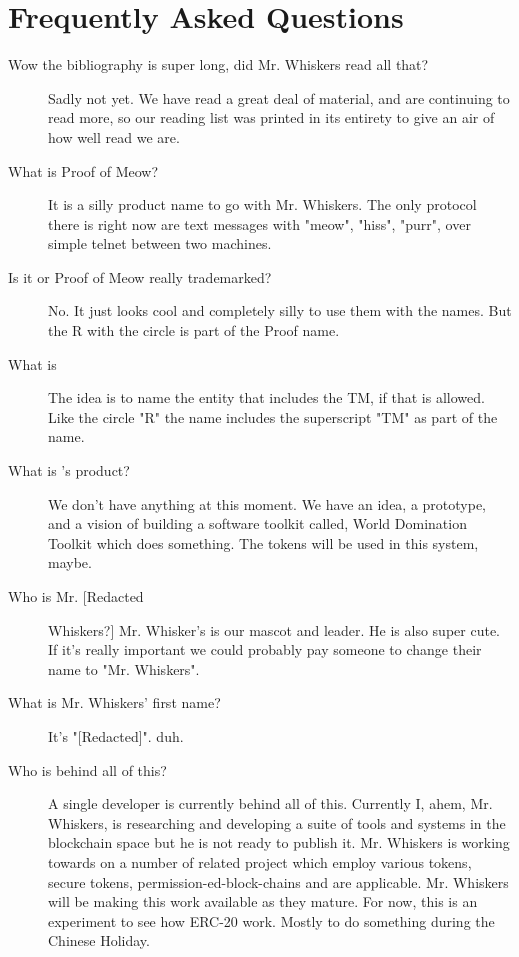 
\section{Frequently Asked Questions}
\begin{description}
    \item[Wow the bibliography is super long, did Mr. Whiskers read all that?] Sadly not yet. We have read a great deal of material, and are continuing to read more, so our reading list was printed in its entirety to give an air of how well read we are.
    
    \item[What is Proof of Meow\textsuperscript{\textregistered}?] It is a silly product name to go with Mr. Whiskers. The only protocol there is right now are text messages with "meow", "hiss", "purr", over simple telnet between two machines. 
    
    \item[Is it \compu or Proof of Meow\textsuperscript{\textregistered} really trademarked?] No. It just looks cool and completely silly to use them with the names. But the R with the circle is part of the Proof name.
    
    \item[What is \compu{}] The idea is to name the entity that includes the TM, if that is allowed. Like the circle "R" the name includes the superscript "TM" as part  of the name. 
    
    \item[What is \compu{}'s product?] We don't have anything at this moment. We have an idea, a prototype, and a vision of building a software toolkit called, World Domination Toolkit\textsuperscript{\textregistered} which does something. The tokens will be used in this system, maybe. 
    
    \item[Who is Mr. [Redacted] Whiskers?] Mr. Whisker's is our mascot and leader. He is also super cute. If it's really important we could probably pay someone to change their name to "Mr. Whiskers".  
    
    \item[What is Mr. Whiskers' first name?] It's "[Redacted]". duh.
    
    \item[Who is behind all of this?] A single developer is currently behind all of this. Currently I, ahem, Mr. Whiskers, is researching and developing a suite of tools and systems in the blockchain space but he is not ready to publish it. Mr. Whiskers is working towards on a number of related project which employ various tokens, secure tokens, permission-ed-block-chains and are applicable.  Mr. Whiskers will be making this work available as they mature. For now, this is an experiment to see how ERC-20 work.  Mostly to do something during the Chinese Holiday. 


\end{description}
